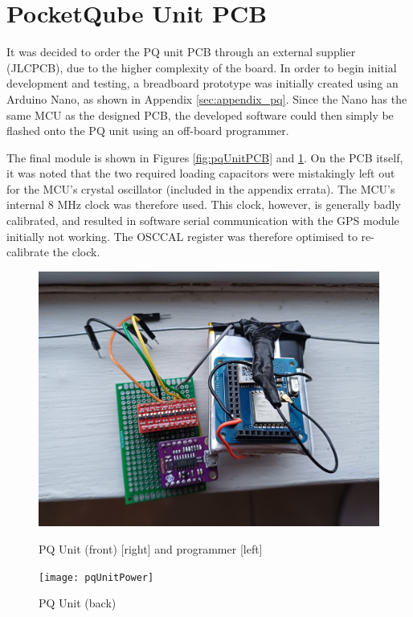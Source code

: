 \graphicspath{{./figures}}

\section{PocketQube Unit PCB}

It was decided to order the PQ unit PCB through an external supplier (JLCPCB), due to the higher complexity of the board. In order to begin initial development and testing, a breadboard prototype was initially created using an Arduino Nano, as shown in Appendix \ref{sec:appendix_pq}. Since the Nano has the same MCU as the designed PCB, the developed software could then simply be flashed onto the PQ unit using an off-board programmer.

The final module is shown in Figures \ref{fig:pqUnitPCB} and \ref{fig:pqUnitPower}. On the PCB itself, it was noted that the two required loading capacitors were mistakingly left out for the MCU's crystal oscillator (included in the appendix errata). The MCU's internal 8 MHz clock was therefore used. This clock, however, is generally badly calibrated, and resulted in software serial communication with the GPS module initially not working. The OSCCAL register was therefore optimised to re-calibrate the clock.

\begin{figure}[!htb]
  \begin{minipage}{.49\textwidth}
    \centering
    \includegraphics[width=0.85\linewidth]{pqUnitPCB}
    \caption{PQ Unit (front) [right] and programmer [left]}
    \label{fig:pqUnitPCB}
  \end{minipage}
  \begin{minipage}{.49\textwidth}
    \centering
    \texttt{[image: pqUnitPower]}
    \caption{PQ Unit (back)}
    \label{fig:pqUnitPower}
  \end{minipage}
\end{figure}


